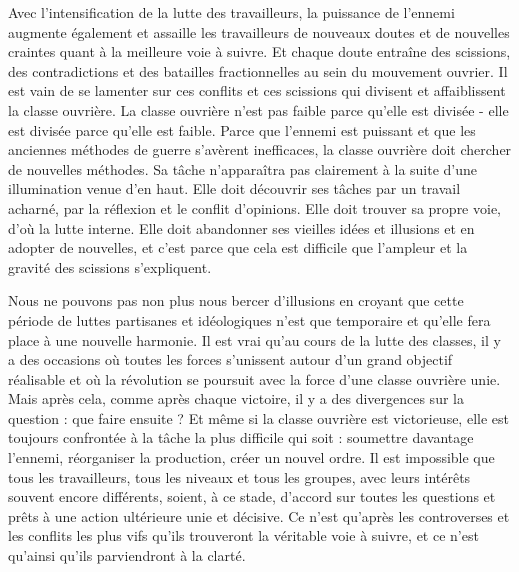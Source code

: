 Avec l'intensification de la lutte des travailleurs, la puissance de l'ennemi augmente également et assaille les travailleurs de nouveaux doutes et de nouvelles craintes quant à la meilleure voie à suivre. Et chaque doute entraîne des scissions, des contradictions et des batailles fractionnelles au sein du mouvement ouvrier. Il est vain de se lamenter sur ces conflits et ces scissions qui divisent et affaiblissent la classe ouvrière. La classe ouvrière n'est pas faible parce qu'elle est divisée - elle est divisée parce qu'elle est faible. Parce que l'ennemi est puissant et que les anciennes méthodes de guerre s'avèrent inefficaces, la classe ouvrière doit chercher de nouvelles méthodes. Sa tâche n'apparaîtra pas clairement à la suite d'une illumination venue d'en haut. Elle doit découvrir ses tâches par un travail acharné, par la réflexion et le conflit d'opinions. Elle doit trouver sa propre voie, d'où la lutte interne. Elle doit abandonner ses vieilles idées et illusions et en adopter de nouvelles, et c'est parce que cela est difficile que l'ampleur et la gravité des scissions s'expliquent.

Nous ne pouvons pas non plus nous bercer d'illusions en croyant que cette période de luttes partisanes et idéologiques n'est que temporaire et qu'elle fera place à une nouvelle harmonie. Il est vrai qu'au cours de la lutte des classes, il y a des occasions où toutes les forces s'unissent autour d'un grand objectif réalisable et où la révolution se poursuit avec la force d'une classe ouvrière unie. Mais après cela, comme après chaque victoire, il y a des divergences sur la question : que faire ensuite ? Et même si la classe ouvrière est victorieuse, elle est toujours confrontée à la tâche la plus difficile qui soit : soumettre davantage l'ennemi, réorganiser la production, créer un nouvel ordre. Il est impossible que tous les travailleurs, tous les niveaux et tous les groupes, avec leurs intérêts souvent encore différents, soient, à ce stade, d'accord sur toutes les questions et prêts à une action ultérieure unie et décisive. Ce n'est qu'après les controverses et les conflits les plus vifs qu'ils trouveront la véritable voie à suivre, et ce n'est qu'ainsi qu'ils parviendront à la clarté.

